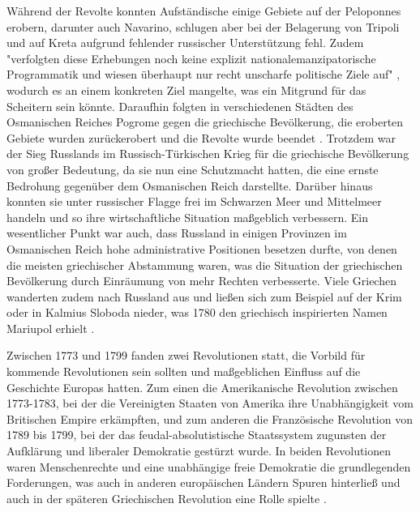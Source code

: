 \documentclass[preprint]{geomorphica} %
\begin{document}
Während der Revolte konnten Aufständische einige Gebiete auf der Peloponnes erobern, darunter auch Navarino, schlugen aber bei der Belagerung von Tripoli und auf Kreta aufgrund fehlender russischer Unterstützung fehl.
Zudem "verfolgten diese Erhebungen noch keine explizit nationalemanzipatorische Programmatik und wiesen überhaupt nur recht unscharfe politische Ziele auf" \cite{Zelepos2015}, wodurch es an einem konkreten Ziel mangelte, was ein Mitgrund für das Scheitern sein könnte.
Daraufhin folgten in verschiedenen Städten des Osmanischen Reiches Pogrome gegen die griechische Bevölkerung, die eroberten Gebiete wurden zurückerobert und die Revolte wurde beendet \cite{Hösch1964}.
Trotzdem war der Sieg Russlands im Russisch-Türkischen Krieg für die griechische Bevölkerung von großer Bedeutung, da sie nun eine Schutzmacht hatten, die eine ernste Bedrohung gegenüber dem Osmanischen Reich darstellte. 
Darüber hinaus konnten sie unter russischer Flagge frei im Schwarzen Meer und Mittelmeer handeln und so ihre wirtschaftliche Situation maßgeblich verbessern.
Ein wesentlicher Punkt war auch, dass Russland in einigen Provinzen im Osmanischen Reich hohe administrative Positionen besetzen durfte, von denen die meisten griechischer Abstammung waren, was die Situation der griechischen Bevölkerung durch Einräumung von mehr Rechten verbesserte.
Viele Griechen wanderten zudem nach Russland aus und ließen sich zum Beispiel auf der Krim oder in Kalmius Sloboda nieder, was 1780 den griechisch inspirierten Namen Mariupol erhielt \cite{Anderson1966, Hösch1964, Dakin1973, Brewer2012}.

Zwischen 1773 und 1799 fanden zwei Revolutionen statt, die Vorbild für kommende Revolutionen sein sollten und maßgeblichen Einfluss auf die Geschichte Europas hatten.
Zum einen die Amerikanische Revolution zwischen 1773-1783, bei der die Vereinigten Staaten von Amerika ihre Unabhängigkeit vom Britischen Empire erkämpften, und zum anderen die Französische Revolution von 1789 bis 1799, bei der das feudal-absolutistische Staatssystem zugunsten der Aufklärung und liberaler Demokratie gestürzt wurde.
In beiden Revolutionen waren Menschenrechte und eine unabhängige freie Demokratie die grundlegenden Forderungen, was auch in anderen europäischen Ländern Spuren hinterließ und auch in der späteren Griechischen Revolution eine Rolle spielte \cite{Jourdan2022}. 
\end{document}
